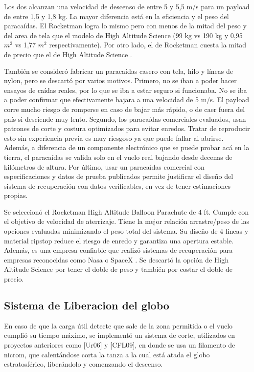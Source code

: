 \documentclass[12pt,a4paper]{article}
\begin{document}
Los dos alcanzan una velocidad de descenso de entre 5 y 5,5 m/s para un payload de entre 1,5 y 1,8 kg. La mayor diferencia está en la eficiencia y el peso del paracaídas. El Rocketman logra lo mismo pero con menos de la mitad del peso y del area de tela que el modelo de High Altitude Science (99 kg vs 190 kg y 0,95 \(m^{2}\) vs 1,77 \(m^{2}\) respectivamente). Por otro lado, el de Rocketman cuesta la mitad de precio que el de High Altitude Science \cite{ref97,ref98}.

También se consideró fabricar un paracaídas casero con tela, hilo y líneas de nylon, pero se descartó por varios motivos. Primero, no se iban a poder hacer ensayos de caídas reales, por lo que se iba a estar seguro si funcionaba. No se iba a poder confirmar que efectivamente bajara a una velocidad de 5 m/s. El payload corre mucho riesgo de romperse en caso de bajar más rápido, o de caer fuera del país si desciende muy lento. Segundo, los paracaídas comerciales evaluados, usan patrones de corte y costura optimizados para evitar enredos. Tratar de reproducir esto sin experiencia previa es muy riesgoso ya que puede fallar al abrirse. Además, a diferencia de un componente electrónico que se puede probar acá en la tierra, el paracaídas se valida solo en el vuelo real bajando desde decenas de kilómetros de altura. Por último, usar un paracaídas comercial con especificaciones y datos de prueba publicados permite justificar el diseño del sistema de recuperación con datos verificables, en vez de tener estimaciones propias.

Se seleccionó el Rocketman High Altitude Balloon Parachute de 4 ft. Cumple con el objetivo de velocidad de aterrizaje. Tiene la mejor relación arrastre/peso de las opciones evaluadas minimizando el peso total del sistema. Su diseño de 4 líneas y material ripstop reduce el riesgo de enredo y garantiza una apertura estable. Además, es una empresa confiable que realizó sistemas de recuperación para empresas reconocidas como Nasa o SpaceX \cite{ref98}. Se descartó la opción de High Altitude Science por tener el doble de peso y también por costar el doble de precio.

\subsection*{Sistema de Liberacion del globo}\label{sistema-de-liberacion-del-globo}

En caso de que la carga útil detecte que sale de la zona permitida o el vuelo cumplió su tiempo máximo, se implementó un sistema de corte, utilizados en proyectos anteriores como {[}Ur06{]} y {[}CFL09{]}, en donde se usa un filamento de nicrom, que calentándose corta la tanza a la cual está atada el globo estratosférico, liberándolo y comenzando el descenso.
\end{document}
